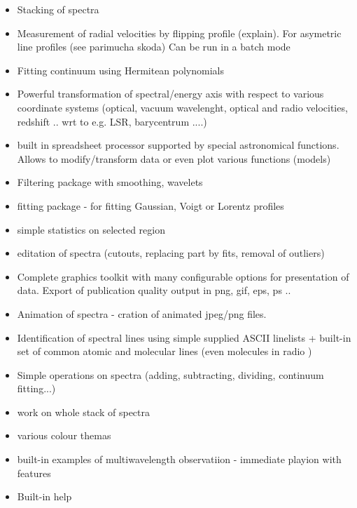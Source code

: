 \documentclass[final,authoryear,5p,times,twocolumn]{elsarticle}
\begin{document}
\begin{itemize}

\item Stacking of spectra 

\item Measurement of radial velocities by flipping profile (explain). For asymetric line profiles (see parimucha skoda) Can be run in a batch mode 

\item Fitting continuum using Hermitean polynomials

\item Powerful transformation of spectral/energy axis with respect to various coordinate systems (optical, vacuum wavelenght, optical and radio velocities, redshift .. wrt to e.g. LSR, barycentrum ....)

\item built in spreadsheet processor supported by special astronomical functions. Allows to modify/transform data or even plot various functions (models)

\item Filtering package with smoothing, wavelets

\item fitting package - for fitting Gaussian, Voigt or Lorentz profiles

\item simple statistics on selected region

\item editation of spectra (cutouts, replacing part by fits, removal of outliers)

\item Complete graphics toolkit with many configurable options for presentation of data. Export of publication quality output in png, gif, eps, ps ..

\item Animation of spectra - cration of animated jpeg/png files.

\item Identification of spectral lines using simple supplied ASCII linelists + built-in set of common  atomic and molecular lines (even molecules in radio )

\item Simple operations on spectra (adding, subtracting, dividing, continuum fitting...)


\item work on whole stack of spectra 

\item various colour themas
\item built-in examples of multiwavelength observatiion - immediate playion with features 

\item Built-in help 


\end{itemize}
\end{document}

